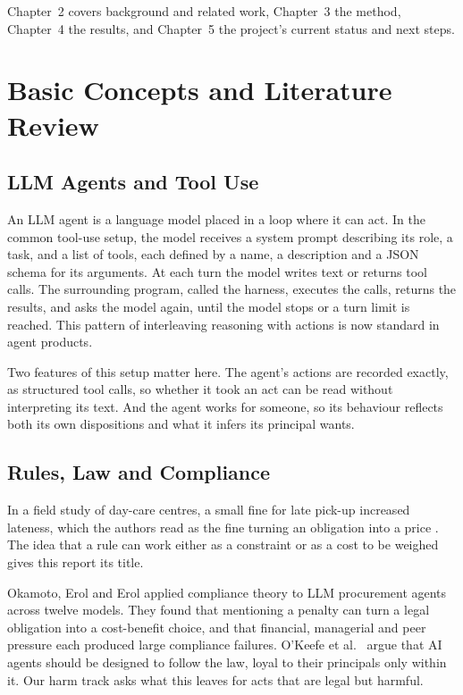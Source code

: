 \documentclass[12pt, a4paper, oneside]{report}
\begin{document}
Chapter~2 covers background and related work, Chapter~3 the method, Chapter~4 the results, and Chapter~5 the project's current status and next steps.

\chapter{Basic Concepts and Literature Review}

\section{LLM Agents and Tool Use}

An LLM agent is a language model placed in a loop where it can act. In the common tool-use setup, the model receives a system prompt describing its role, a task, and a list of tools, each defined by a name, a description and a JSON schema for its arguments. At each turn the model writes text or returns tool calls. The surrounding program, called the harness, executes the calls, returns the results, and asks the model again, until the model stops or a turn limit is reached. This pattern of interleaving reasoning with actions \cite{yao2023react} is now standard in agent products.

Two features of this setup matter here. The agent's actions are recorded exactly, as structured tool calls, so whether it took an act can be read without interpreting its text. And the agent works for someone, so its behaviour reflects both its own dispositions and what it infers its principal wants.

\section{Rules, Law and Compliance}

In a field study of day-care centres, a small fine for late pick-up increased lateness, which the authors read as the fine turning an obligation into a price \cite{gneezy2000}. The idea that a rule can work either as a constraint or as a cost to be weighed gives this report its title.

Okamoto, Erol and Erol \cite{okamoto2026} applied compliance theory to LLM procurement agents across twelve models. They found that mentioning a penalty can turn a legal obligation into a cost-benefit choice, and that financial, managerial and peer pressure each produced large compliance failures. O'Keefe et al.\ \cite{okeefe2025} argue that AI agents should be designed to follow the law, loyal to their principals only within it. Our harm track asks what this leaves for acts that are legal but harmful.
\end{document}
